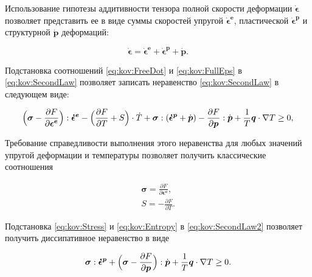 Использование гипотезы аддитивности тензора полной скорости деформации $\boldsymbol{\dot{\epsilon}}$ позволяет представить ее в виде суммы скоростей упругой $\boldsymbol{\dot{\epsilon}^{e}}$, пластической $\boldsymbol{\dot{\epsilon}^{p}}$ и структурной $\dot{\boldsymbol{p}}$ деформаций:

\begin{equation}

\boldsymbol{\dot{\epsilon}}=\boldsymbol{\dot{\epsilon}^{e}}+\boldsymbol{\dot{\epsilon}^{p}}+\dot{\boldsymbol{p}}. \label{eq:kov:FullEps}

\end{equation}

Подстановка соотношений \eqref{eq:kov:FreeDot} и \eqref{eq:kov:FullEps} в \eqref{eq:kov:SecondLaw} позволяет записать неравенство \eqref{eq:kov:SecondLaw} в следующем виде:

\begin{equation}

\Bigl(\boldsymbol{\sigma}-\frac{\partial F}{\partial{\boldsymbol{\epsilon^{e}}}}\Bigr):\boldsymbol{\dot{\epsilon}^{e}}- \Bigl(\frac{\partial F}{\partial T}+S\Bigr)\cdot\dot{T}+\boldsymbol{\sigma}:(\boldsymbol{\dot{\epsilon}^{p}}+\dot{\boldsymbol{p}})-\frac{\partial F}{\partial{\boldsymbol{p}}}:\dot{\boldsymbol{p}}+\frac{1}{T}\boldsymbol{q}\cdot\nabla{T}\geq0, \label{eq:kov:SecondLaw2}

\end{equation}

Требование справедливости  выполнения этого неравенства для любых значений упругой деформации и температуры позволяет получить классические соотношения

\begin{gather}

\boldsymbol{\sigma}=\frac{\partial F}{\partial{\boldsymbol{\epsilon^{e}}}}, \label{eq:kov:Stress}

\\

S=-\frac{\partial F}{\partial T}. \label{eq:kov:Entropy}

\end{gather}

Подстановка \eqref{eq:kov:Stress} и \eqref{eq:kov:Entropy} в \eqref{eq:kov:SecondLaw2} позволяет получить диссипативное неравенство в виде

\begin{equation}

\boldsymbol{\sigma}:\boldsymbol{\dot{\epsilon}^{p}}+

\Bigl(\boldsymbol{\sigma}-\frac{\partial F}{\partial{\boldsymbol{p}}}\Bigr):\dot{\boldsymbol{p}}+\frac{1}{T}\boldsymbol{q}\cdot\nabla{T}\geq0. \label{eq:kov:Dissip}

\end{equation}

